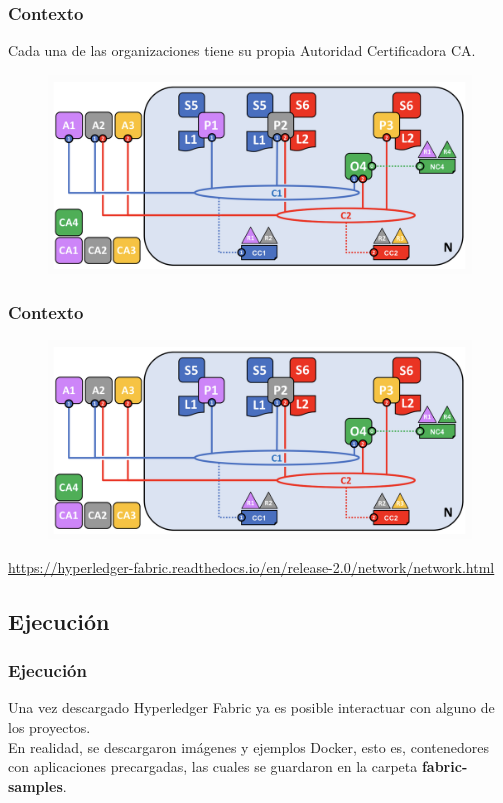 \documentclass{beamer}
\begin{document}
	\begin{frame}
		\frametitle{Contexto}
		Cada una de las organizaciones tiene su propia Autoridad Certificadora CA.
		\begin{figure}[h]
			\includegraphics[scale=.3]{start_01}
			\centering
		\end{figure}
	\end{frame}
	
	\begin{frame}
		\frametitle{Contexto}
		\begin{figure}[h]
			\includegraphics[scale=.4]{start_01}
			\centering
		\end{figure}
		\begin{center}
			\tiny{\url{https://hyperledger-fabric.readthedocs.io/en/release-2.0/network/network.html}}
		\end{center}
		
	\end{frame}
	
	\subsection{Ejecución}
	
	\begin{frame}
		\frametitle{Ejecución}
		Una vez descargado Hyperledger Fabric ya es posible interactuar con alguno de los proyectos.\\
		\vspace{4mm}
		En realidad, se descargaron imágenes y ejemplos Docker, esto es, contenedores con aplicaciones precargadas, las cuales se guardaron en la carpeta \textbf{fabric-samples}.
	\end{frame}
\end{document}
